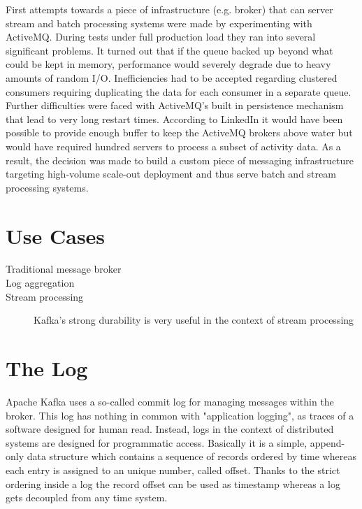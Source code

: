 First attempts towards a piece of infrastructure (e.g. broker) that can server
stream and batch processing systems were made by experimenting with
ActiveMQ\cite{activemq}. During tests under full production load they ran into
several significant problems. It turned out that if the queue backed up beyond what could
be kept in memory, performance would severely degrade due to heavy amounts of
random I/O. Inefficiencies had to be accepted regarding clustered consumers
requiring duplicating the data for each consumer in a separate queue. Further
difficulties were faced with ActiveMQ's built in persistence mechanism that lead
to very long restart times. 
According to LinkedIn it would have been possible to provide enough buffer to
keep the ActiveMQ brokers above water but would have required hundred servers to
process a subset of activity data. As a result, the decision was made to build a
custom piece of messaging infrastructure targeting high-volume scale-out
deployment and thus serve batch and stream processing systems. 
\cite{goodhope2012building}

\section{Use Cases}
\begin{description}
    \item [Traditional message broker]
    \item [Log aggregation]
    \item [Stream processing] Kafka's strong durability is very useful in the
        context of stream processing
\end{description}

\section{The Log}
\label{intro-kafka-log}
Apache Kafka uses a so-called commit log for managing messages within the
broker. This log has nothing in common with "application logging", as traces of
a software designed for human read. Instead, logs in the context of distributed systems
are designed for programmatic access. Basically it is a simple, append-only data
structure which contains a sequence of records ordered by time whereas each
entry is assigned to an unique number, called offset. Thanks to the strict
ordering inside a log the record offset can be used as timestamp whereas a log
gets decoupled from any time system. \cite{apachekafka} \cite{JK-TheLog}

